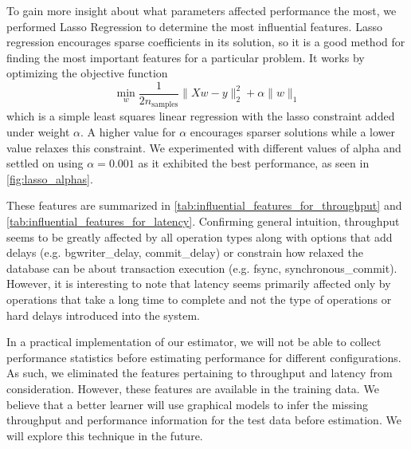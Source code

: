To gain more insight about what parameters affected performance the
most, we performed Lasso Regression to determine the most influential
features. Lasso regression encourages sparse coefficients in its
solution, so it is a good method for finding the most important
features for a particular problem. It works by optimizing the
objective function
\begin{equation*}
  \min\limits_{w}
  \frac{1}{2n_{\textrm{samples}}} \|Xw - y\|_2^2 + \alpha \|w\|_1
\end{equation*}
which is a simple least squares linear regression with the lasso
constraint added under weight $\alpha$. A higher value for $\alpha$
encourages sparser solutions while a lower value relaxes this
constraint. We experimented with different values of alpha and settled
on using $\alpha = 0.001$ as it exhibited the best performance, as seen in
\cref{fig:lasso_alphas}.

 These features are summarized in
\cref{tab:influential_features_for_throughput} and
\cref{tab:influential_features_for_latency}. Confirming general
intuition, throughput seems to be greatly affected by all operation
types along with options that add delays (e.g. bgwriter\_delay,
commit\_delay) or constrain how relaxed the database can be about
transaction execution (e.g. fsync, synchronous\_commit). However, it
is interesting to note that latency seems primarily affected only by
operations that take a long time to complete and not the type of
operations or hard delays introduced into the system.

In a practical implementation of our estimator, we will not be able
to collect performance statistics before estimating performance for
different configurations. As such, we eliminated the features
pertaining to throughput and latency from consideration. However,
these features are available in the training data. We believe that a
better learner will use graphical models to infer the missing
throughput and performance information for the test data before
estimation. We will explore this technique in the future.